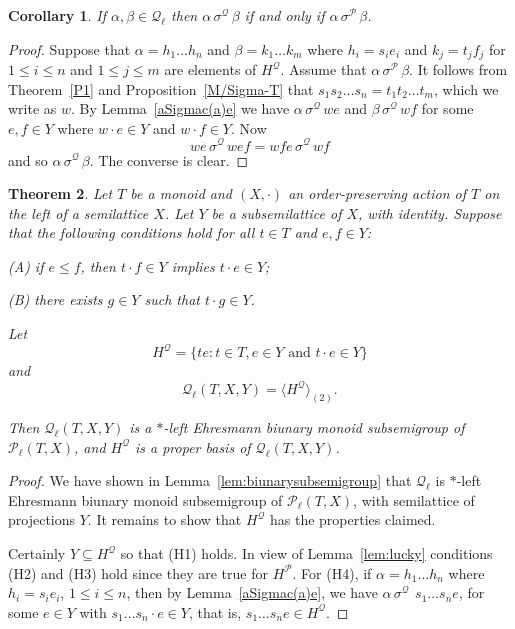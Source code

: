 \documentclass[12pt]{amsart}
\newtheorem{them}{Theorem}[section]
\newtheorem{cor}[them]{Corollary}
\theoremstyle{definition}
\theoremstyle{definition}
\numberwithin{them}{section}
\numberwithin{equation}{section}
\newcommand{\QQ}{\mbox{$\mathcal{Q}_\ell$}}
\begin{document}
{{\begin{cor}\label{cor:PSigma=QSigma}
If $\alpha, \beta\in \QQ$ then $\alpha\, \sigma^{\mathcal{Q}}\, \beta$ if and only if $\alpha\, \sigma^{\mathcal{P}}\, \beta$.
\end{cor}
\begin{proof}
 Suppose that $\alpha =h_1\dots h_n$ and $\beta=k_1\dots k_m$ where
 $h_i=s_ie_i$ and $k_j=t_jf_j$ for 
 $1\leq i\leq n$ and $1\leq j\leq m$ are elements of $H^{\mathcal{Q}}$.  Assume that  $\alpha\, \sigma^{\mathcal{P}}\, \beta$. It follows from Theorem~\ref{P1} and Proposition~\ref{M/Sigma-T}  that $s_1s_2\dots s_n = t_1t_2\dots t_m$, which we write as $w$. By Lemma~\ref{aSigmac(a)e} we have $\alpha\, \sigma^{\mathcal{Q}}\, we$ and $\beta\, \sigma^{\mathcal{Q}}\, wf$ for some $e, f \in Y$ where $w \cdot e \in Y$ and $w \cdot f \in Y$. Now \[we\,\sigma^{\mathcal{Q}}\, wef=wfe\,\sigma^{\mathcal{Q}}\, wf\]
 and so $\alpha \, \sigma^{\mathcal{Q}}\, \beta$. The converse is clear.
\end{proof}

\begin{them}\label{them:Q} 
Let $T$ be a monoid  and  $(X,\cdot)$  an order-preserving action of $T$ on the left of a semilattice $X$.  Let  $Y$ be a subsemilattice of $X$, with identity.  Suppose that
the following conditions hold for all $t\in T$ and $e,f\in Y$:

(A) if  $e \leq f$, then $t \cdot f \in Y$ implies $t \cdot e \in Y$;

(B) there exists $g \in Y$ such that $t \cdot g \in Y$.

Let 
\[H^{\mathcal{Q}}=\{ te:t\in T, e\in Y\mbox{ and }t\cdot e\in Y\}\]
and  \[\QQ(T, X, Y)=\langle H^{\mathcal{Q}}\rangle_{(2)}. \]

Then $\QQ(T, X, Y)$ is a $*$-left Ehresmann 
 biunary  monoid subsemigroup of \, 
 $\mathcal{P}_{\ell}(T,X)$, and $H^{\mathcal{Q}}$ is a proper  basis of  $\QQ(T, X, Y)$. 
\end{them}
\begin{proof} We have shown in Lemma~\ref{lem:biunarysubsemigroup}  that   $\QQ$  is $*$-left Ehresmann biunary monoid subsemigroup of $\mathcal{P}_{\ell}(T,X)$, with semilattice of  projections $Y$. It remains to show that $H^{\mathcal{Q}}$ has the properties claimed.


Certainly $Y\subseteq H^{\mathcal{Q}}$ so that (H1) holds. In view of Lemma~\ref{lem:lucky} conditions (H2) and (H3) hold since they are true for $H^{\mathcal{P}}$. For (H4), if
$\alpha=h_1\dots h_n$ where $h_i=s_ie_i$, $1\leq i\leq n$, then by Lemma~\ref{aSigmac(a)e}, we have 
$\alpha\,\sigma^{\mathcal{Q}}\,\ s_1\dots s_ne$, for some $e\in Y$ with $s_1\dots s_n\cdot e\in Y$, that is, 
$s_1\dots s_ne\in H^{\mathcal{Q}}$.  


\end{proof}}}
\end{document}
